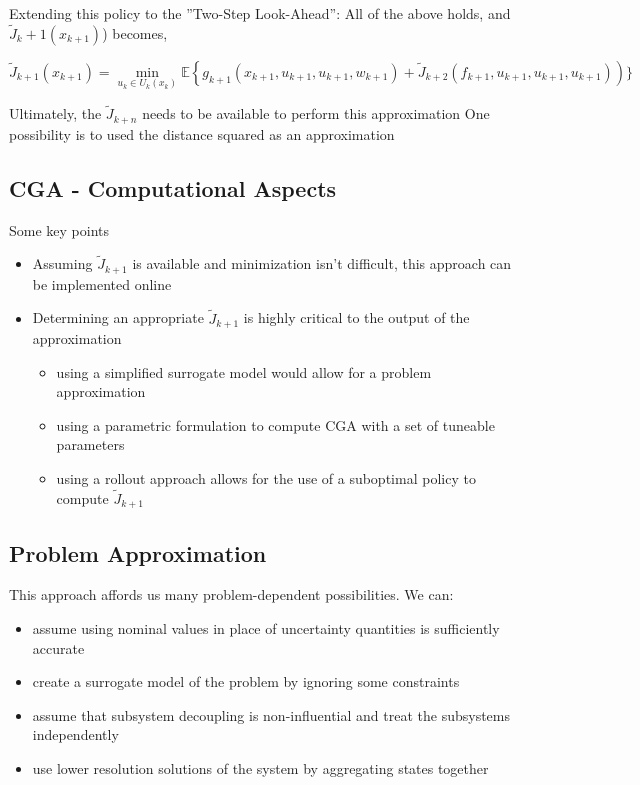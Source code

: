 \documentclass[twoside]{article}
\begin{document}
 Extending this policy to the ”Two-Step Look-Ahead”: All of the above holds, and $\tilde{J}_{k}+1\left(x_{k+1}\right)$) becomes,

$$ 
\tilde{J}_{k+1}\left(x_{k+1}\right)=\min _{u_{k} \in U_{k}\left(x_{k}\right)} \mathbb{E}\left\{g_{k+1}\left(x_{k+1}, u_{k+1}, u_{k+1}, w_{k+1}\right)+\tilde{J}_{k+2}\left(f_{k+1}, u_{k+1}, u_{k+1}, u_{k+1}\right)\right) \}
 $$	
	
Ultimately, the $\tilde{J}_{k+n}$ needs to be available to perform this approximation
One possibility is to used the distance squared as an approximation


\subsection{CGA - Computational Aspects}
Some key points
\begin{itemize}
    \item Assuming $\tilde{J}_{k+1}$ is available and minimization isn’t difficult, this approach can be implemented online
    \item Determining an appropriate $\tilde{J}_{k+1}$ is highly critical to the output of the approximation
    \begin{itemize}
        \item using a simplified surrogate model would allow for a problem approximation
        \item using a parametric formulation to compute CGA with a set of tuneable parameters
        \item using a rollout approach allows for the use of a suboptimal policy to compute $\tilde{J}_{k+1}$
    \end{itemize}
    
\end{itemize}

\subsection{Problem Approximation}
This approach affords us many problem-dependent possibilities. We can:
\begin{itemize}
    \item assume using nominal values in place of uncertainty quantities is sufficiently accurate
    \item create a surrogate model of the problem by ignoring some constraints
    \item assume that subsystem decoupling is non-influential and treat the subsystems independently
    \item use lower resolution solutions of the system by aggregating states together
\end{itemize}
\end{document}
